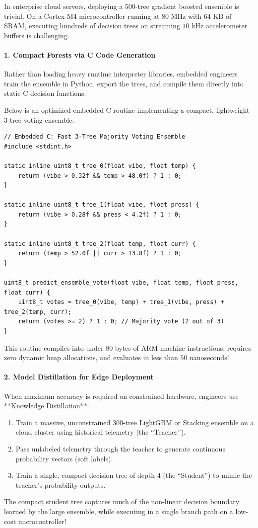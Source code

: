 \begin{iotbox}
In enterprise cloud servers, deploying a 500-tree gradient boosted ensemble is trivial. On a Cortex-M4 microcontroller running at $80\text{ MHz}$ with $64\text{ KB}$ of SRAM, executing hundreds of decision trees on streaming $10\text{ kHz}$ accelerometer buffers is challenging.

\paragraph{1. Compact Forests via C Code Generation}
Rather than loading heavy runtime interpreter libraries, embedded engineers train the ensemble in Python, export the trees, and compile them directly into static C decision functions. 

Below is an optimized embedded C routine implementing a compact, lightweight 3-tree voting ensemble:

\begin{lstlisting}[style=pythonstyle]
// Embedded C: Fast 3-Tree Majority Voting Ensemble
#include <stdint.h>

static inline uint8_t tree_0(float vibe, float temp) {
    return (vibe > 0.32f && temp > 48.0f) ? 1 : 0;
}

static inline uint8_t tree_1(float vibe, float press) {
    return (vibe > 0.28f && press < 4.2f) ? 1 : 0;
}

static inline uint8_t tree_2(float temp, float curr) {
    return (temp > 52.0f || curr > 13.8f) ? 1 : 0;
}

uint8_t predict_ensemble_vote(float vibe, float temp, float press, float curr) {
    uint8_t votes = tree_0(vibe, temp) + tree_1(vibe, press) + tree_2(temp, curr);
    return (votes >= 2) ? 1 : 0; // Majority vote (2 out of 3)
}
\end{lstlisting}
This routine compiles into under $80$ bytes of ARM machine instructions, requires zero dynamic heap allocations, and evaluates in less than $50$ nanoseconds!

\paragraph{2. Model Distillation for Edge Deployment}
When maximum accuracy is required on constrained hardware, engineers use **Knowledge Distillation**:
\begin{enumerate}
    \item Train a massive, unconstrained 300-tree LightGBM or Stacking ensemble on a cloud cluster using historical telemetry (the ``Teacher'').
    \item Pass unlabeled telemetry through the teacher to generate continuous probability vectors (soft labels).
    \item Train a single, compact decision tree of depth $4$ (the ``Student'') to mimic the teacher's probability outputs.
\end{enumerate}
The compact student tree captures much of the non-linear decision boundary learned by the large ensemble, while executing in a single branch path on a low-cost microcontroller!
\end{iotbox}

